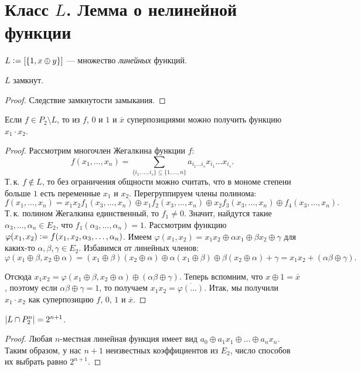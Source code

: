 \section{Класс $L$. Лемма о нелинейной функции}

\begin{definition}
    $L \vcentcolon = [\{1, x \oplus y\}]$ --- множество \textit{линейных} функций.
\end{definition}

\begin{proposal}
    $L$ замкнут.
\end{proposal}

\begin{proof}
    Следствие замкнутости замыкания.
\end{proof}

\begin{lemma}
    Если $f \in P_2 \setminus L$, то из $f$, $0$ и $1$ и $\overline{x}$ суперпозициями можно получить функцию $x_1 \cdot x_2$.
\end{lemma}

\begin{proof}
    Рассмотрим многочлен Жегалкина функции $f$:
    \[
        f(x_1, \ldots, x_n) = \sum_{\{i_1, \ldots, i_s\} \subseteq \{1, \ldots, n\}}a_{i_1\ldots i_s}x_{i_1}\ldots x_{i_s}.
    \]
    Т.\,к. $f \notin L$, то без ограничения общности можно считать, что в мономе степени больше $1$ есть переменные $x_1$ и $x_2$. Перегруппируем члены полинома:
    \[
        f(x_1, \ldots, x_n) = x_1x_2f_1(x_3, \ldots, x_n) \oplus x_1f_2(x_3, \ldots, x_n) \oplus x_2f_3(x_3, \ldots, x_n) \oplus f_4(x_3, \ldots, x_n).
    \]
    Т.\,к. полином Жегалкина единственный, то $f_1 \ne 0$. Значит, найдутся такие $\alpha_3, \ldots, \alpha_n \in E_2$, что $f_1(\alpha_3, \ldots, \alpha_n) = 1$. Рассмотрим функцию $\varphi(x_1, x_2) \vcentcolon = f(x_1, x_2, \alpha_3, \ldots, \alpha_n)$. Имеем $\varphi(x_1, x_2) = x_1x_2 \oplus \alpha x_1 \oplus \beta x_2 \oplus \gamma$ для каких-то $\alpha, \beta, \gamma \in E_2$. Избавимся от линейных членов:
    \[
        \varphi(x_1 \oplus \beta, x_2 \oplus \alpha) = (x_1 \oplus \beta)(x_2 \oplus \alpha) \oplus \alpha(x_1 \oplus \beta) \oplus \beta(x_2 \oplus \alpha) + \gamma = x_1x_2 + (\alpha\beta \oplus \gamma).
    \]

    Отсюда $x_1x_2 = \varphi(x_1 \oplus \beta, x_2 \oplus \alpha) \oplus (\alpha\beta \oplus \gamma)$. Теперь вспомним, что $x \oplus 1 = \overline{x}$, поэтому если $\alpha\beta \oplus \gamma = 1$, то получаем $x_1x_2 = \overline{\varphi(\ldots)}$. Итак, мы получили $x_1 \cdot x_2$ как суперпозицию $f$, $0$, $1$ и $\overline{x}$.
\end{proof}

\begin{proposal}
    $\left\lvert L \cap P_2^n\right\rvert = 2^{n + 1}$.
\end{proposal}

\begin{proof}
    Любая $n$-местная линейная функция имеет вид $a_0 \oplus a_1x_1 \oplus \ldots \oplus a_nx_n$. Таким образом, у нас $n + 1$ неизвестных коэффициентов из $E_2$, число способов их выбрать равно $2^{n + 1}$.
\end{proof}

